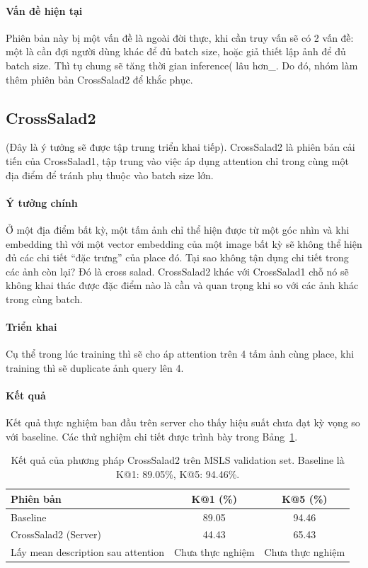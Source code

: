 \paragraph{Vấn đề hiện tại}
Phiên bản này bị một vấn đề là ngoài đời thực, khi cần truy vấn sẽ có 2 vấn đề: một là cần đợi người dùng khác để đủ batch size, hoặc giả thiết lập ảnh để đủ batch size. Thì tụ chung sẽ tăng thời gian inference( lâu hơn_. Do đó, nhóm làm thêm phiên bản CrossSalad2 để khắc phục.

\subsection{CrossSalad2}
(Đây là ý tưởng sẽ được tập trung triển khai tiếp). CrossSalad2 là phiên bản cải tiến của CrossSalad1, tập trung vào việc áp dụng attention chỉ trong cùng một địa điểm để tránh phụ thuộc vào batch size lớn.

\paragraph{Ý tưởng chính}
Ở một địa điểm bất kỳ, một tấm ảnh chỉ thể hiện được từ một góc nhìn và khi embedding thì với một vector embedding của một image bất kỳ sẽ không thể hiện đủ các chi tiết ``đặc trưng'' của place đó. Tại sao không tận dụng chi tiết trong các ảnh còn lại? Đó là cross salad. CrossSalad2 khác với CrossSalad1 chỗ nó sẽ không khai thác được đặc điểm nào là cần và quan trọng khi so với các ảnh khác trong cùng batch.

\paragraph{Triển khai}
Cụ thể trong lúc training thì sẽ cho áp attention trên 4 tấm ảnh cùng place, khi training thì sẽ duplicate ảnh query lên 4.

\paragraph{Kết quả}
Kết quả thực nghiệm ban đầu trên server cho thấy hiệu suất chưa đạt kỳ vọng so với baseline. Các thử nghiệm chi tiết được trình bày trong Bảng~\ref{tab:crosssalad2_results}.

\begin{table}[t]
\centering
\caption{Kết quả của phương pháp CrossSalad2 trên MSLS validation set. Baseline là K@1: 89.05\%, K@5: 94.46\%.}
\label{tab:crosssalad2_results}
\small
\begin{tabular}{@{}lcc@{}}
\toprule
\textbf{Phiên bản} & \textbf{K@1 (\%)} & \textbf{K@5 (\%)} \\
\midrule
Baseline & 89.05 & 94.46 \\
CrossSalad2 (Server) & 44.43 & 65.43 \\
Lấy mean description sau attention & Chưa thực nghiệm & Chưa thực nghiệm \\
\bottomrule
\end{tabular}
\end{table}

